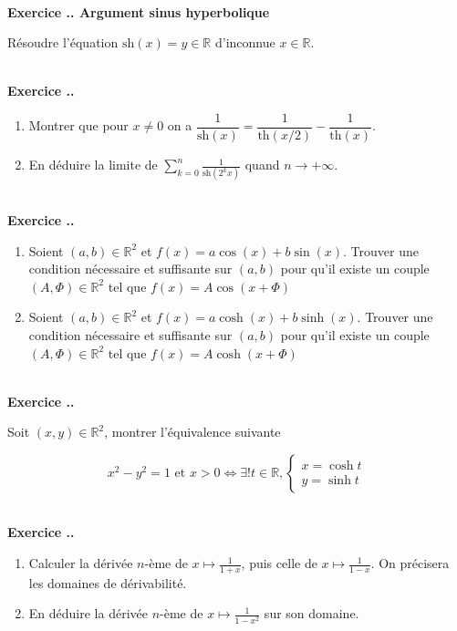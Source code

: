 \documentclass{article}
\newcommand{\mb}[1]{\mathbb{#1}}
\newcounter{exo}
\newcommand{\exercice}[1][\null]{\textbf{\\ \large Exercice \thesection.\theexo. \normalsize #1} \addtocounter{exo}{1}}
\begin{document}
\exercice[Argument sinus hyperbolique]

Résoudre l'équation $\text{sh}(x) =y \in \mb{R}$ d'inconnue $x \in \mb{R}$.


\exercice

\begin{enumerate}

\item Montrer que pour $x \neq 0$ on a $\dfrac{1}{\text{sh}(x)} = \dfrac{1}{\text{th}(x/2)} - \dfrac{1}{\text{th}(x)}$.


\item En déduire la limite de $\displaystyle \sum_{k=0}^n \frac{1}{\text{sh}(2^kx)}$ quand $n \rightarrow + \infty$.

\end{enumerate}

\exercice

\begin{enumerate}

    \item Soient $(a,b) \in \mb{R}^2$ et $f(x) = a \cos(x) + b \sin(x)$.
Trouver une condition nécessaire et suffisante sur $(a,b)$
pour qu'il existe un couple $(A,\Phi) \in \mb{R}^2$ tel que 
$f(x) = A \cos (x + \Phi)$

    \item Soient $(a,b) \in \mb{R}^2$ et $f(x) = a \cosh(x) + b \sinh(x)$.
Trouver une condition nécessaire et suffisante sur $(a,b)$
pour qu'il existe un couple $(A,\Phi) \in \mb{R}^2$ tel que 
$f(x) = A \cosh (x + \Phi)$
\end{enumerate}

\exercice

Soit $(x,y) \in \mb{R}^2$, montrer l'équivalence suivante 

\begin{equation*}
    x^2-y^2=1\text{ et }x>0
    \iff
    \exists! t \in \mb{R},
    \begin{cases}
        x = \cosh t \\
        y = \sinh t 
    \end{cases}
\end{equation*}

\exercice 

\begin{enumerate}

\item Calculer la dérivée $n$-ème de $x \mapsto \frac{1}{1+x}$, puis celle de $x \mapsto \frac{1}{1-x}$. On précisera les domaines de dérivabilité.

\item En déduire la dérivée $n$-ème de $x \mapsto \frac{1}{1-x^2}$ sur son domaine.

\end{enumerate}
\end{document}
